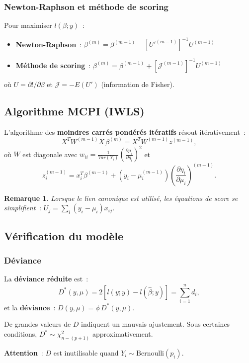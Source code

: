 \documentclass[11pt,letterpaper]{article}
\newtheorem{remarque}{Remarque}[section]
\begin{document}
\subsubsection{Newton-Raphson et méthode de scoring}
Pour maximiser $l(\beta;y)$~:
\begin{itemize}
\item \textbf{Newton-Raphson}~: $\beta^{(m)} = \beta^{(m-1)} - [U'^{(m-1)}]^{-1} U^{(m-1)}$
\item \textbf{Méthode de scoring}~: $\beta^{(m)} = \beta^{(m-1)} + [\mathcal{J}^{(m-1)}]^{-1} U^{(m-1)}$
\end{itemize}
où $U = \partial l/\partial \beta$ et $\mathcal{J} = -E(U') $ (information de Fisher).

\subsection{Algorithme MCPI (IWLS)}

L'algorithme des \textbf{moindres carrés pondérés itératifs} résout itérativement~:
$$X^T W^{(m-1)} X \, \beta^{(m)} = X^T W^{(m-1)} z^{(m-1)},$$
où $W$ est diagonale avec $w_{ii} = \frac{1}{Var(Y_i)}\left(\frac{\partial \mu_i}{\partial \eta_i}\right)^2$ et 
$$z_i^{(m-1)} = x_i^T \beta^{(m-1)} + (y_i - \mu_i^{(m-1)})\left(\frac{\partial \eta_i}{\partial \mu_i}\right)^{(m-1)}.$$

\begin{remarque}
Lorsque le lien canonique est utilisé, les équations de score se simplifient~: $U_j = \sum_i (y_i - \mu_i) x_{ij}$.
\end{remarque}

\subsection{Vérification du modèle}

\subsubsection{Déviance}

La \textbf{déviance réduite} est~:
$$D^*(y,\mu) = 2[l(y;y) - l(\hat{\beta};y)] = \sum_{i=1}^n d_i,$$
et la \textbf{déviance}~: $D(y,\mu) = \phi\, D^*(y,\mu)$.

De grandes valeurs de $D$ indiquent un mauvais ajustement. Sous certaines conditions, $D^* \sim \chi^2_{n-(p+1)}$ approximativement.

\textbf{Attention}~: $D$ est inutilisable quand $Y_i \sim \text{Bernoulli}(p_i)$.
\end{document}
